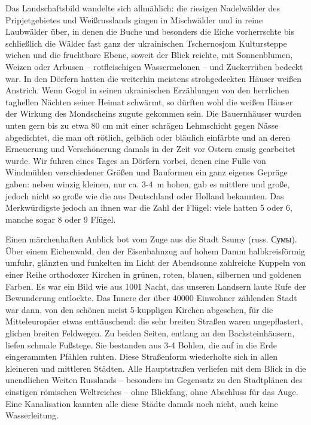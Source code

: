\documentclass[a5paper,pagesize,10pt,twoside=true]{scrbook}
\newcommand\textcyr[1]{{\fontencoding{OT2}\fontfamily{wncyr}\selectfont #1}}	%
\begin{document}
Das Landschaftsbild wandelte sich allmählich: die riesigen Nadelwälder des Pripjetgebietes und Weißrusslands gingen in Mischwälder und in reine Laubwälder über, in denen die Buche und besonders die Eiche vorherrschte bis schließlich die Wälder fast ganz der ukrainischen Tschernosjom Kultursteppe wichen und die fruchtbare Ebene, soweit der Blick reichte, mit Sonnenblumen, Weizen oder Arbusen -- rotfleischigen Wassermelonen -- und Zuckerrüben bedeckt war. In den Dörfern hatten die weiterhin meistens strohgedeckten Häuser weißen Anstrich. Wenn Gogol in seinen ukrainischen Erzählungen von den herrlichen taghellen Nächten seiner Heimat schwärmt, so dürften wohl die weißen Häuser der Wirkung des Mondscheins zugute gekommen sein. Die Bauernhäuser wurden unten gern bis zu etwa 80 cm mit einer schrägen Lehmschicht gegen Nässe abgedichtet, die man oft rötlich, gelblich oder bläulich einfärbte und an deren Erneuerung und Verschönerung damals in der Zeit vor Ostern emsig gearbeitet wurde. Wir fuhren eines Tages an Dörfern vorbei, denen eine Fülle von Windmühlen verschiedener Größen und Bauformen ein ganz eigenes Gepräge gaben: neben winzig kleinen, nur ca. 3-4~m hohen, gab es mittlere und große, jedoch nicht so große wie die aus Deutschland oder Holland bekannten. Das Merkwürdigste jedoch an ihnen war die Zahl der Flügel: viele hatten 5 oder 6, manche sogar 8 oder 9 Flügel.

Einen märchenhaften Anblick bot vom Zuge aus die Stadt Ssumy (russ. \textcyr{Сумы}). Über einem Eichenwald, den der Eisenbahnzug auf hohem Damm halbkreisförmig umfuhr, glänzten und funkelten im Licht der Abendsonne zahlreiche Kuppeln von einer Reihe orthodoxer Kirchen in grünen, roten, blauen, silbernen und goldenen Farben. Es war ein Bild wie aus 1001 Nacht, das unseren Landsern laute Rufe der Bewunderung entlockte. Das Innere der über \num{40000} Einwohner zählenden Stadt war dann, von den schönen meist 5-kuppligen Kirchen abgesehen, für die Mitteleuropäer etwas enttäuschend: die sehr breiten Straßen waren ungepflastert, glichen breiten Feldwegen. Zu beiden Seiten, entlang an den Backsteinhäusern, liefen schmale Fußstege. Sie bestanden aus 3-4 Bohlen, die auf in die Erde eingerammten Pfählen ruhten. Diese Straßenform wiederholte sich in allen kleineren und mittleren Städten. Alle Hauptstraßen verliefen mit dem Blick in die unendlichen Weiten Russlands -- besonders im Gegensatz zu den Stadtplänen des einstigen römischen Weltreiches -- ohne Blickfang, ohne Abschluss für das Auge. Eine Kanalisation kannten alle diese Städte damals noch nicht, auch keine Wasserleitung.
\end{document}
